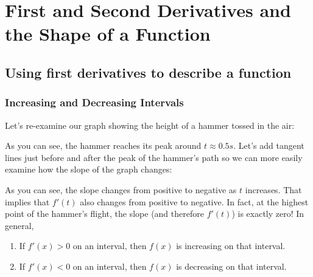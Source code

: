 \chapter{First and Second Derivatives and the Shape of a Function}
\section{Using first derivatives to describe a function}
\subsection{Increasing and Decreasing Intervals}

Let's re-examine our graph showing the height of a hammer tossed in the air:



As you can see, the hammer reaches its peak around $t \approx 0.5s$. Let's add tangent lines just before and after the peak of the hammer's path so we can more easily examine how the slope of the graph changes:


As you can see, the slope changes from positive to negative as $t$ increases. That implies that $f'(t)$ also changes from positive to negative. In fact, at the highest point of the hammer's flight, the slope (and therefore $f'(t)$) is exactly zero! In general, 
\begin{enumerate}
\item If $f'(x)>0$ on an interval, then $f(x)$ is increasing on that interval.
\item If $f'(x)<0$ on an interval, then $f(x)$ is decreasing on that interval. 
\end{enumerate}


